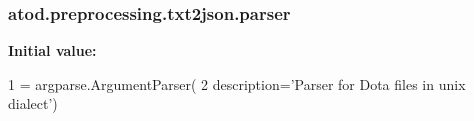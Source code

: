 \subsubsection[{\texorpdfstring{parser}{parser}}]{\setlength{\rightskip}{0pt plus 5cm}atod.\+preprocessing.\+txt2json.\+parser}\hypertarget{namespaceatod_1_1preprocessing_1_1txt2json_ad9db2aa36d2f77ee14cfdea7d30d7c6b}{}\label{namespaceatod_1_1preprocessing_1_1txt2json_ad9db2aa36d2f77ee14cfdea7d30d7c6b}
{\bfseries Initial value\+:}
\begin{DoxyCode}
1 = argparse.ArgumentParser(
2     description=\textcolor{stringliteral}{'Parser for Dota files in unix dialect'})
\end{DoxyCode}
